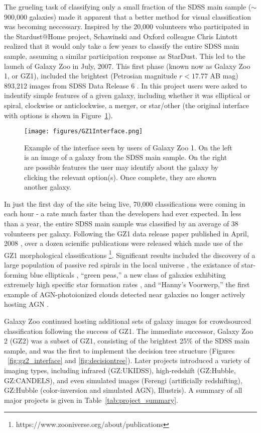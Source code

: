 The grueling task of classifying only a small fraction of the SDSS main sample ($\sim$ 900,000 galaxies) made it apparent that a better method for visual classification was becoming neccessary. Inspired by the 20,000 volunteers who participated in the Stardust@Home project, Schawinski and Oxford colleague Chris Lintott realized that it would only take a few years to classify the entire SDSS main sample, assuming a similar participation response as StarDust. This led to the launch of Galaxy Zoo in July, 2007. This first phase (known now as Galaxy Zoo 1, or GZ1), included the brightest (Petrosian magnitude $r < 17.77$ AB mag) 893,212 images from SDSS Data Release 6 \citep{Strauss2002,AdelmanMcCarthy2008}. In this project users were asked to indentify simple features of a given galaxy, including whether it was elliptical or spiral, clockwise or anticlockwise, a merger, or star/other (the original interface with options is shown in Figure~\ref{GZ1_Interface}). 

\begin{figure}
\centering
\texttt{[image: figures/GZ1Interface.png]}
\caption{Example of the interface seen by users of Galaxy Zoo 1. On the left is an image of a galaxy from the SDSS main sample. On the right are possible features the user may identify about the galaxy by clicking the relevant option(s). Once complete, they are shown another galaxy.}
\label{GZ1_Interface}
\end{figure}

In just the first day of the site being live, 70,000 classifications were coming in each hour - a rate much faster than the developers had ever expected. In less than a year, the entire SDSS main sample was classified by an average of 38 volunteers per galaxy. Following the GZ1 data release paper published in April, 2008 \citep{Lintott2008}, over a dozen scienific publications were released which made use of the GZ1 morphological classifications \footnote{https://www.zooniverse.org/about/publications}. Significant results included the discovery of a large population of passive red spirals in the local universe \citep{Masters2010}, the existance of star-forming blue ellipticals \citep{Schawinski2009b}, ``green peas,'' a new class of galaxies exhibiting extremely high specific star formation rates \citep{Cardamone2009}, and ``Hanny's Voorwerp,'' the first example of AGN-photoionized clouds detected near galaxies no longer actively hosting AGN \citep{Lintott2009}. 

Galaxy Zoo continued hosting additional sets of galaxy images for crowdsourced classification following the success of GZ1. The immediate successor, Galaxy Zoo 2 (GZ2) was a subset of GZ1, consisting of the brightest 25\% of the SDSS main sample, and was the first to implement the decision tree structure (Figures ~\ref{fig:gz2_interface} and \ref{fig:decisiontree}). Later projects introduced a variety of imaging types, including infrared (GZ:UKIDSS), high-redshift (GZ:Hubble, GZ:CANDELS), and even simulated images (Ferengi (artificially redshifting), GZ:Hubble (color-inversion and simulated AGN), Illustris). A summary of all major projects is given in Table~\ref{tab:project_summary}. 

